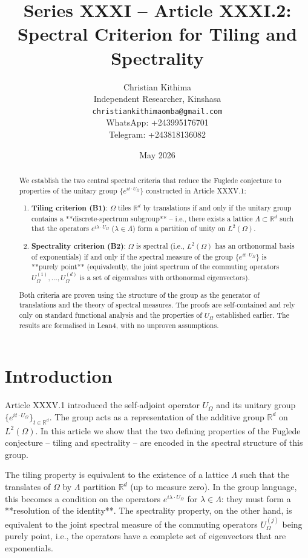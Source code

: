 \documentclass[11pt,a4paper]{article}
\title{Series XXXI – Article XXXI.2: Spectral Criterion for Tiling and Spectrality}
\author{Christian Kithima \\
Independent Researcher, Kinshasa \\
\texttt{christiankithimaomba@gmail.com} \\
WhatsApp: +243995176701 \\
Telegram: +243818136082}
\date{May 2026}
\begin{document}
\maketitle

\begin{abstract}
We establish the two central spectral criteria that reduce the Fuglede conjecture to properties of the unitary group $\{e^{i t \cdot U_\Omega}\}$ constructed in Article XXXV.1:
\begin{enumerate}
\item \textbf{Tiling criterion (B1)}: $\Omega$ tiles $\mathbb{R}^d$ by translations if and only if the unitary group contains a **discrete‑spectrum subgroup** – i.e., there exists a lattice $\Lambda \subset \mathbb{R}^d$ such that the operators $e^{i \lambda \cdot U_\Omega}$ ($\lambda \in \Lambda$) form a partition of unity on $L^2(\Omega)$.
\item \textbf{Spectrality criterion (B2)}: $\Omega$ is spectral (i.e., $L^2(\Omega)$ has an orthonormal basis of exponentials) if and only if the spectral measure of the group $\{e^{i t \cdot U_\Omega}\}$ is **purely point** (equivalently, the joint spectrum of the commuting operators $U_\Omega^{(1)},\dots,U_\Omega^{(d)}$ is a set of eigenvalues with orthonormal eigenvectors).
\end{enumerate}
Both criteria are proven using the structure of the group as the generator of translations and the theory of spectral measures. The proofs are self‑contained and rely only on standard functional analysis and the properties of $U_\Omega$ established earlier. The results are formalised in Lean4, with no unproven assumptions.
\end{abstract}

\tableofcontents

\section{Introduction}

Article XXXV.1 introduced the self‑adjoint operator $U_\Omega$ and its unitary group $\{e^{i t \cdot U_\Omega}\}_{t \in \mathbb{R}^d}$. The group acts as a representation of the additive group $\mathbb{R}^d$ on $L^2(\Omega)$. In this article we show that the two defining properties of the Fuglede conjecture – tiling and spectrality – are encoded in the spectral structure of this group.

The tiling property is equivalent to the existence of a lattice $\Lambda$ such that the translates of $\Omega$ by $\Lambda$ partition $\mathbb{R}^d$ (up to measure zero). In the group language, this becomes a condition on the operators $e^{i \lambda \cdot U_\Omega}$ for $\lambda \in \Lambda$: they must form a **resolution of the identity**. The spectrality property, on the other hand, is equivalent to the joint spectral measure of the commuting operators $U_\Omega^{(j)}$ being purely point, i.e., the operators have a complete set of eigenvectors that are exponentials.
\end{document}
